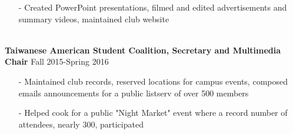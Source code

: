\documentclass[10pt]{article}
\begin{document}
        \indent\begin{minipage}{\dimexpr\textwidth-6cm}
            \begin{itemize}[noitemsep, topsep=0pt]
                \item[-] Created PowerPoint presentations, filmed and edited advertisements and summary videos, maintained club website
            \end{itemize}\vspace{0mm}
        \end{minipage}\\
    \indent\small{\textbf{Taiwanese American Student Coalition, Secretary and Multimedia Chair}} \hfill \small{Fall 2015-Spring 2016}\indent\vspace{0.5mm}
        \indent\begin{minipage}{\dimexpr\textwidth-6cm}
            \begin{itemize}[noitemsep, topsep=0pt]
                \item[-] Maintained club records, reserved locations for campus events, composed emails announcements for a public listserv of over 500 members
                \item[-] Helped cook for a public "Night Market" event where a record number of attendees, nearly 300, participated
            \end{itemize}\vspace{0mm}
        \end{minipage}
\end{document}
